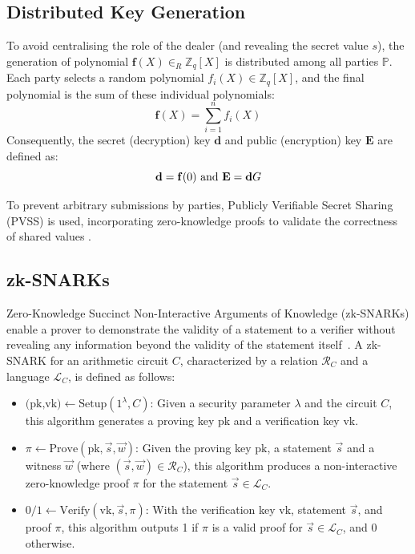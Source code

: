 \documentclass[lettersize,journal]{IEEEtran}
\theoremstyle{definition}
\begin{document}
\subsection*{Distributed Key Generation}
To avoid centralising the role of the dealer (and revealing the secret value $s$), the generation of polynomial $\mathbf{f}(X) \in_R \mathbb{Z}_q[X]$ is distributed among all parties $\mathbb{P}$. Each party selects a random polynomial $f_{i}(X) \in \mathbb{Z}_q[X]$, and the final polynomial is the sum of these individual polynomials: 
\begin{equation}
  \mathbf{f}(X)=\sum_{i=1}^{n}f_i(X)  
\end{equation}
Consequently, the secret (decryption) key $\mathbf{d}$ and public (encryption) key $\mathbf{E}$ are defined as: 
\begin{equation}
\mathbf{d}=\mathbf{f}(0)\ \textrm{and}\ \mathbf{E}=\mathbf{d} \G
\end{equation}
 
To prevent arbitrary submissions by parties, Publicly Verifiable Secret Sharing (PVSS) is used, incorporating zero-knowledge proofs to validate the correctness of shared values \cite{goosSimplePubliclyVerifiable1999}.


\subsection{zk-SNARKs}

Zero-Knowledge Succinct Non-Interactive Arguments of Knowledge (zk-SNARKs) enable a prover to demonstrate the validity of a statement to a verifier without revealing any information beyond the validity of the statement itself~\cite{grothSizePairingBasedNoninteractive2016}. A zk-SNARK for an arithmetic circuit $C$, characterized by a relation $\mathcal{R}_C$ and a language $\mathcal{L}_C$, is defined as follows:
\begin{itemize}
    \item $\textrm{(pk,vk)} \gets \textrm{Setup}(1^\lambda,C)$: Given a security parameter $\lambda$ and the circuit $C$, this algorithm generates a proving key $\textrm{pk}$ and a verification key $\textrm{vk}$.
    \item $\pi \gets \textrm{Prove}(\textrm{pk}, \vec{s}, \vec{w})$: Given the proving key $\textrm{pk}$, a statement $\vec{s}$ and a witness $\vec{w}$ (where $(\vec{s},\vec{w}) \in \mathcal{R}_C$), this algorithm produces a non-interactive zero-knowledge proof $\pi$ for the statement $\vec{s} \in \mathcal{L}_C$.
     \item $0/1 \gets \textrm{Verify}(\textrm{vk}, \vec{s}, \pi)$: With the verification key $\textrm{vk}$, statement $\vec{s}$, and proof $\pi$, this algorithm outputs 1 if $\pi$ is a valid proof for $\vec{s} \in \mathcal{L}_C$, and 0 otherwise.
\end{itemize}
\end{document}
